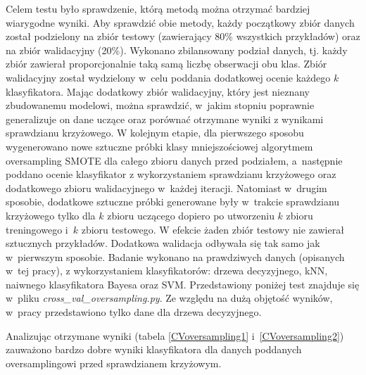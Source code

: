 Celem testu było sprawdzenie, którą metodą można otrzymać bardziej wiarygodne wyniki. Aby sprawdzić obie metody, każdy początkowy zbiór danych został podzielony na zbiór testowy (zawierający 80\% wszystkich przykładów) oraz na zbiór walidacyjny (20\%). Wykonano zbilansowany podział danych, tj. każdy zbiór zawierał proporcjonalnie taką samą liczbę obserwacji obu klas. Zbiór walidacyjny został wydzielony w~celu poddania dodatkowej ocenie każdego $k$ klasyfikatora. Mając dodatkowy zbiór walidacyjny, który jest nieznany zbudowanemu modelowi, można sprawdzić, w~jakim stopniu poprawnie generalizuje on dane uczące oraz porównać otrzymane wyniki z wynikami sprawdzianu krzyżowego. W kolejnym etapie, dla pierwszego sposobu wygenerowano nowe sztuczne próbki klasy mniejszościowej algorytmem oversampling SMOTE dla całego zbioru danych przed podziałem, a~następnie poddano ocenie klasyfikator z wykorzystaniem sprawdzianu krzyżowego oraz dodatkowego zbioru walidacyjnego w~każdej iteracji. Natomiast w~drugim sposobie, dodatkowe sztuczne próbki generowane były w~trakcie sprawdzianu krzyżowego tylko dla $k$ zbioru uczącego dopiero po utworzeniu $k$ zbioru treningowego i~$k$ zbioru testowego. W efekcie żaden zbiór testowy nie zawierał sztucznych przykładów. Dodatkowa walidacja odbywała się tak samo jak w~pierwszym sposobie. Badanie wykonano na prawdziwych danych (opisanych w~tej pracy), z wykorzystaniem klasyfikatorów: drzewa decyzyjnego, kNN, naiwnego klasyfikatora Bayesa oraz SVM. Przedstawiony poniżej test znajduje się w~pliku \textit{cross\_val\_oversampling.py}. Ze względu na dużą objętość wyników, w~pracy przedstawiono tylko dane dla drzewa decyzyjnego. \par
Analizując otrzymane wyniki (tabela \ref{CVoversampling1} i~\ref{CVoversampling2}) zauważono bardzo dobre wyniki klasyfikatora dla danych poddanych oversamplingowi przed sprawdzianem krzyżowym.
